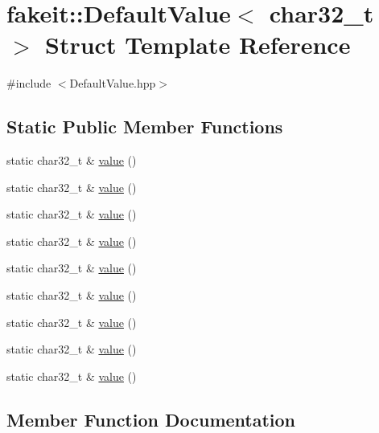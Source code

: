 \hypertarget{structfakeit_1_1DefaultValue_3_01char32__t_01_4}{}\section{fakeit\+::Default\+Value$<$ char32\+\_\+t $>$ Struct Template Reference}
\label{structfakeit_1_1DefaultValue_3_01char32__t_01_4}


{\ttfamily \#include $<$Default\+Value.\+hpp$>$}

\subsection*{Static Public Member Functions}
\begin{DoxyCompactItemize}
\item 
static char32\+\_\+t \& \mbox{\hyperlink{structfakeit_1_1DefaultValue_3_01char32__t_01_4_ac13a220a319b9ad49e7e5e639b743f85}{value}} ()
\item 
static char32\+\_\+t \& \mbox{\hyperlink{structfakeit_1_1DefaultValue_3_01char32__t_01_4_ac13a220a319b9ad49e7e5e639b743f85}{value}} ()
\item 
static char32\+\_\+t \& \mbox{\hyperlink{structfakeit_1_1DefaultValue_3_01char32__t_01_4_ac13a220a319b9ad49e7e5e639b743f85}{value}} ()
\item 
static char32\+\_\+t \& \mbox{\hyperlink{structfakeit_1_1DefaultValue_3_01char32__t_01_4_ac13a220a319b9ad49e7e5e639b743f85}{value}} ()
\item 
static char32\+\_\+t \& \mbox{\hyperlink{structfakeit_1_1DefaultValue_3_01char32__t_01_4_ac13a220a319b9ad49e7e5e639b743f85}{value}} ()
\item 
static char32\+\_\+t \& \mbox{\hyperlink{structfakeit_1_1DefaultValue_3_01char32__t_01_4_ac13a220a319b9ad49e7e5e639b743f85}{value}} ()
\item 
static char32\+\_\+t \& \mbox{\hyperlink{structfakeit_1_1DefaultValue_3_01char32__t_01_4_ac13a220a319b9ad49e7e5e639b743f85}{value}} ()
\item 
static char32\+\_\+t \& \mbox{\hyperlink{structfakeit_1_1DefaultValue_3_01char32__t_01_4_ac13a220a319b9ad49e7e5e639b743f85}{value}} ()
\item 
static char32\+\_\+t \& \mbox{\hyperlink{structfakeit_1_1DefaultValue_3_01char32__t_01_4_ac13a220a319b9ad49e7e5e639b743f85}{value}} ()
\end{DoxyCompactItemize}


\subsection{Member Function Documentation}
\mbox{\label{structfakeit_1_1DefaultValue_3_01char32__t_01_4_ac13a220a319b9ad49e7e5e639b743f85}} 
